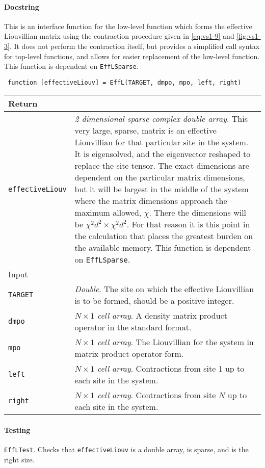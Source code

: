  \paragraph{Docstring} This is an interface function for the low-level function which forms the effective Liouvillian matrix using the contraction procedure given in \cref{eq:vs1-9} and \cref{fig:vs1-3}. It does not perform the contraction itself, but provides a simplified call syntax for top-level functions, and allows for easier replacement of the low-level function. This function is dependent on \lstinline$EffLSparse$.
 \begin{lstlisting}
 function [effectiveLiouv] = EffL(TARGET, dmpo, mpo, left, right) \end{lstlisting}
 \begin{longtabu}{X[1,1]X[4,1]}
 \hline
 Return & \\ \hline
 \lstinline$effectiveLiouv$ & \emph{2 dimensional sparse complex double array}. This very large, sparse, matrix is an effective Liouvillian for that particular site in the system. It is eigensolved, and the eigenvector reshaped to replace the site tensor. The exact dimensions are dependent on the particular matrix dimensions, but it will be largest in the middle of the system where the matrix dimensions approach the maximum allowed, \(\chi\). There the dimensions will be \(\chi^{2}d^{2} \times \chi^{2}d^{2}\). For that reason it is this point in the calculation that places the greatest burden on the available memory. This function is dependent on \lstinline$EffLSparse$. \\ \hline
 Input & \\ \hline
 \lstinline$TARGET$ & \emph{Double}. The site on which the effective Liouvillian is to be formed, should be a positive integer. \\
 \lstinline$dmpo$ & \emph{\(N \times 1\) cell array}. A density matrix product operator in the standard format. \\
 \lstinline$mpo$ & \emph{\(N \times 1\) cell array}. The Liouvillian for the system in matrix product operator form. \\
 \lstinline$left$ & \emph{\(N \times 1\) cell array}. Contractions from site 1 up to each site in the system. \\
 \lstinline$right$ & \emph{\(N \times 1\) cell array}. Contractions from site \(N\) up to each site in the system. \\
 \hline
 \end{longtabu}
 \paragraph{Testing} \lstinline$EffLTest$. Checks that \lstinline$effectiveLiouv$ is a double array, is sparse, and is the right size. 

